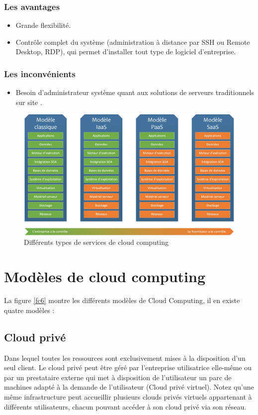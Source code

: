 \subsubsection{Les avantages}
\begin{itemize}
    \item Grande flexibilité.
    \item Contrôle complet du système (administration à distance par SSH ou Remote Desktop, RDP), qui permet d'installer tout type de logiciel d'entreprise.

\end{itemize}
\subsubsection{Les inconvénients}
\begin{itemize}
    \item Besoin d'administrateur système quant aux solutions de serveurs traditionnels sur site \cite{c5}.
\end{itemize}
\begin{figure}[H]
\centering
\includegraphics[scale=1.2]{chap1/fc5.png}
\caption{Différents types de services de cloud computing}
\label{fc5}
\end{figure}

\section{Modèles de cloud computing}
La figure \ref{fc6} montre les différents modèles de Cloud Computing, il en existe quatre modèles :
\subsection{Cloud privé}
Dans lequel toutes les ressources sont exclusivement mises à la disposition d'un seul client. Le cloud privé peut être géré par l'entreprise utilisatrice elle-même ou par un prestataire externe qui met à disposition de l'utilisateur un parc de machines adapté à la demande de l'utilisateur (Cloud privé virtuel). Notez qu'une même infrastructure peut accueillir plusieurs clouds privés virtuels appartenant à différents utilisateurs, chacun pouvant accéder à son cloud privé via son réseau.
